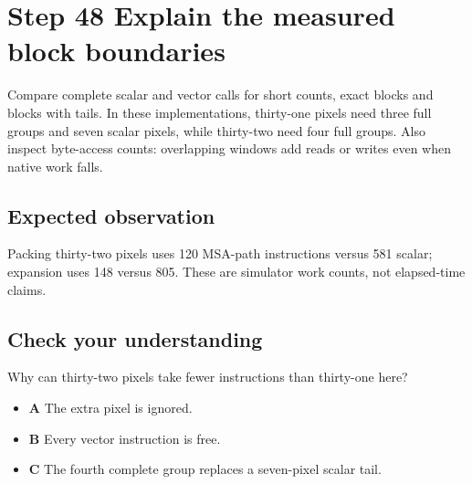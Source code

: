 \section{Step 48 Explain the measured block boundaries}\label{rgb-s48}

Compare complete scalar and vector calls for short counts, exact blocks and blocks with tails. In these implementations, thirty-one pixels need three full groups and seven scalar pixels, while thirty-two need four full groups. Also inspect byte-access counts: overlapping windows add reads or writes even when native work falls.

\subsection{Expected observation}
Packing thirty-two pixels uses 120 MSA-path instructions versus 581 scalar; expansion uses 148 versus 805. These are simulator work counts, not elapsed-time claims.

\subsection{Check your understanding}
Why can thirty-two pixels take fewer instructions than thirty-one here?

\begin{itemize}
  \item \textbf{A} The extra pixel is ignored.
  \item \textbf{B} Every vector instruction is free.
  \item \textbf{C} The fourth complete group replaces a seven-pixel scalar tail.
\end{itemize}

